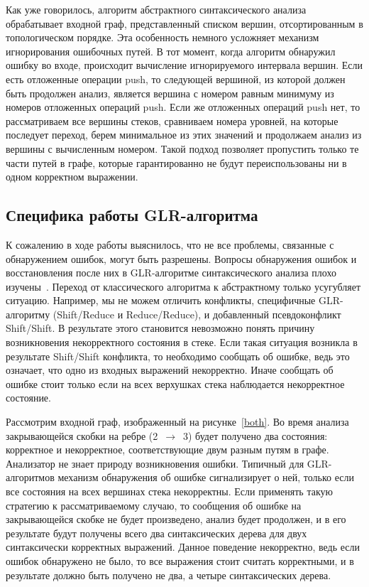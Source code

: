 \documentclass{matmex-diploma}
\begin{document}
Как уже говорилось, алгоритм абстрактного синтаксического анализа обрабатывает 
входной граф, представленный списком вершин, отсортированным в топологическом 
порядке. Эта особенность немного усложняет механизм игнорирования ошибочных путей. 
В тот момент, когда алгоритм обнаружил ошибку во входе, происходит вычисление 
игнорируемого интервала вершин. Если есть отложенные операции push, то следующей 
вершиной, из которой должен быть продолжен анализ, является вершина с номером 
равным минимуму из номеров отложенных операций push. Если же отложенных операций 
push нет, то рассматриваем все вершины стеков, сравниваем номера уровней, на 
которые последует переход, берем минимальное из этих значений и продолжаем анализ 
из вершины с вычисленным номером. Такой подход позволяет пропустить только те 
части путей в графе, которые гарантированно не будут переиспользованы ни в одном 
корректном выражении. 

\subsection{Специфика работы GLR-алгоритма}
К сожалению в ходе работы выяснилось, что не все проблемы, связанные с обнаружением 
ошибок, могут быть разрешены. Вопросы обнаружения ошибок и восстановления после 
них в GLR-алгоритме синтаксического анализа плохо изучены~\cite{economopoulos2006generalised}. Переход от классического 
алгоритма к абстрактному только усугубляет ситуацию. Например, мы не можем отличить 
конфликты, специфичные GLR-алгоритму (Shift/Reduce и Reduce/Reduce), и добавленный 
псевдоконфликт Shift/Shift. В результате этого становится невозможно понять причину 
возникновения некорректного состояния в стеке. Если такая ситуация возникла в 
результате Shift/Shift конфликта, то необходимо сообщать об ошибке, ведь это 
означает, что одно из входных выражений некорректно. Иначе сообщать об ошибке 
стоит только если на всех верхушках стека наблюдается некорректное состояние. 

Рассмотрим входной граф, изображенный на рисунке~\ref{both}. Во время анализа закрывающейся 
скобки на ребре (2~$\to$~3) будет получено два состояния: корректное и некорректное, 
соответствующие двум разным путям в графе. Анализатор не знает природу возникновения 
ошибки. Типичный для GLR-алгоритмов механизм обнаружения об ошибке сигнализирует 
о ней, только если все состояния на всех вершинах стека некорректны. Если применять 
такую стратегию к рассматриваемому случаю, то сообщения об ошибке на закрывающейся 
скобке не будет произведено, анализ будет продолжен, и в его результате будут 
получены всего два синтаксических дерева для двух синтаксически корректных выражений. 
Данное поведение некорректно, ведь если ошибок обнаружено не было, то все выражения 
стоит считать корректными, и в результате должно быть получено не два, а четыре 
синтаксических дерева.
\end{document}
